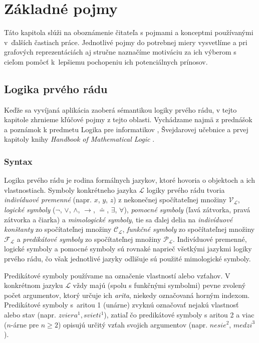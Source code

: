 \chapter{Základné pojmy}

\label{kap:vychodiska} %

Táto kapitola slúži na oboznámenie čitateľa s pojmami a konceptmi používanými v~ďalších častiach práce. Jednotlivé pojmy do potrebnej miery vysvetlíme a pri grafových reprezentáciách aj stručne naznačíme motiváciu za ich výberom s cieľom pomôcť k~lepšiemu pochopeniu ich potenciálnych prínosov.

\section{Logika prvého rádu}
\label{sec:fol}

Keďže sa vyvíjaná aplikácia zaoberá sémantikou logiky prvého rádu, v tejto kapitole zhrnieme kľúčové pojmy z tejto oblasti. Vychádzame najmä z prednášok a poznámok k predmetu Logika pre informatikov \cite{lpi}, Švejdarovej učebnice \cite{svejdar} a prvej kapitoly knihy \textit{Handbook of Mathematical Logic} \cite{barwise}.

\subsection{Syntax}
Logika prvého rádu je rodina formálnych jazykov, ktoré hovoria o objektoch a ich vlastnostiach. Symboly konkrétneho jazyka $\mathcal{L}$ logiky prvého rádu tvoria \textit{indivíduové premenné} (napr. $x$, $y$, $z$) z nekonečnej spočítateľnej množiny $\mathcal{V}_\mathcal{L}$, \textit{logické symboly} ($\neg$, $\lor$, $\land$, $\rightarrow$, $\doteq$, $\exists$, $\forall$), \textit{pomocné symboly} (ľavá zátvorka, pravá zátvorka a čiarka) a \textit{mimologické symboly}, tie sa ďalej delia na \textit{indivíduové konštanty} zo spočítateľnej množiny $\mathcal{C}_\mathcal{L}$, \textit{funkčné symboly} zo spočítateľnej množiny $\mathcal{F}_\mathcal{L}$ a \textit{predikátové symboly} zo spočítateľnej množiny $\mathcal{P}_\mathcal{L}$. Indivíduové premenné, logické symboly a pomocné symboly sú rovnaké naprieč všetkými jazykmi logiky prvého rádu, čo však jednotlivé jazyky odlišuje sú použité mimologické symboly.

Predikátové symboly používame na označenie vlastností alebo vzťahov. V konkrétnom jazyku $\mathcal{L}$ vždy majú (spolu s funkčnými symbolmi) pevne zvolený počet argumentov, ktorý určuje ich \textit{arita}, niekedy označovaná horným indexom. Predikátové symboly s~aritou 1 (unárne) zvyknú označovať nejakú vlastnosť alebo stav (napr. ${zviera}^1, {svieti}^1$), zatiaľ čo predikátové symboly s aritou 2 a viac ($n$-árne pre $n \geq 2$) opisujú určitý vzťah svojich argumentov (napr. ${nesie}^2$, ${medzi}^3$).

